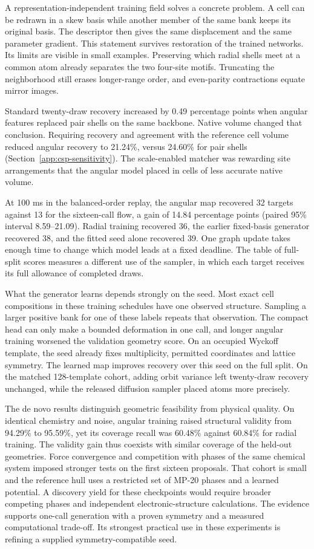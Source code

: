 A representation-independent training field solves a concrete problem. A cell can be redrawn in a skew basis while another member of the same bank keeps its original basis. The descriptor then gives the same displacement and the same parameter gradient. This statement survives restoration of the trained networks. Its limits are visible in small examples. Preserving which radial shells meet at a common atom already separates the two four-site motifs. Truncating the neighborhood still erases longer-range order, and even-parity contractions equate mirror images.

Standard twenty-draw recovery increased by 0.49 percentage points when angular features replaced pair shells on the same backbone. Native volume changed that conclusion. Requiring recovery and agreement with the reference cell volume reduced angular recovery to 21.24\%, versus 24.60\% for pair shells (Section~\ref{app:csp-sensitivity}). The scale-enabled matcher was rewarding site arrangements that the angular model placed in cells of less accurate native volume.

At 100 ms in the balanced-order replay, the angular map recovered 32 targets against 13 for the sixteen-call flow, a gain of 14.84 percentage points (paired 95\% interval 8.59--21.09). Radial training recovered 36, the earlier fixed-basis generator recovered 38, and the fitted seed alone recovered 39. One graph update takes enough time to change which model leads at a fixed deadline. The table of full-split scores measures a different use of the sampler, in which each target receives its full allowance of completed draws.

What the generator learns depends strongly on the seed. Most exact cell compositions in these training schedules have one observed structure. Sampling a larger positive bank for one of these labels repeats that observation. The compact head can only make a bounded deformation in one call, and longer angular training worsened the validation geometry score. On an occupied Wyckoff template, the seed already fixes multiplicity, permitted coordinates and lattice symmetry. The learned map improves recovery over this seed on the full split. On the matched 128-template cohort, adding orbit variance left twenty-draw recovery unchanged, while the released diffusion sampler placed atoms more precisely.

The de novo results distinguish geometric feasibility from physical quality. On identical chemistry and noise, angular training raised structural validity from 94.29\% to 95.59\%, yet its coverage recall was 60.48\% against 60.84\% for radial training. The validity gain thus coexists with similar coverage of the held-out geometries. Force convergence and competition with phases of the same chemical system imposed stronger tests on the first sixteen proposals. That cohort is small and the reference hull uses a restricted set of MP-20 phases and a learned potential. A discovery yield for these checkpoints would require broader competing phases and independent electronic-structure calculations. The evidence supports one-call generation with a proven symmetry and a measured computational trade-off. Its strongest practical use in these experiments is refining a supplied symmetry-compatible seed.
